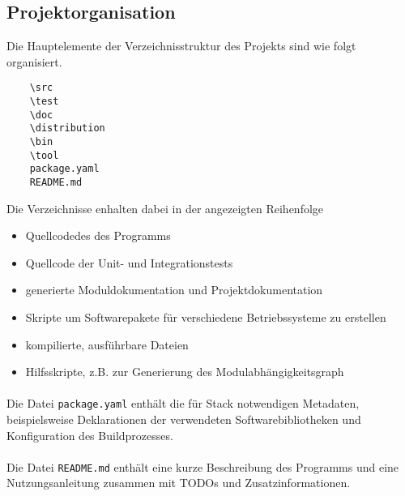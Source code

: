 \subsection{Projektorganisation}
Die Hauptelemente der Verzeichnisstruktur des Projekts sind wie folgt organisiert.

\begin{verbatim}
    \src
    \test
    \doc
    \distribution
    \bin
    \tool
    package.yaml
    README.md
\end{verbatim}

Die Verzeichnisse enhalten dabei in der angezeigten Reihenfolge

\begin{itemize}
    \item Quellcodedes des Programms
    \item Quellcode der Unit- und Integrationstests
    \item generierte Moduldokumentation und Projektdokumentation
    \item Skripte um Softwarepakete für verschiedene Betriebssysteme zu erstellen
    \item kompilierte, ausführbare Dateien
    \item Hilfsskripte, z.B. zur Generierung des Modulabhängigkeitsgraph
\end{itemize}

\paragraph{}
Die Datei \texttt{package.yaml} enthält die für Stack notwendigen Metadaten,
beispielsweise Deklarationen der verwendeten Softwarebibliotheken und Konfiguration
des Buildprozesses.

\paragraph{}
Die Datei \texttt{README.md} enthält eine kurze Beschreibung des
Programms und eine Nutzungsanleitung zusammen mit TODOs und Zusatzinformationen.
